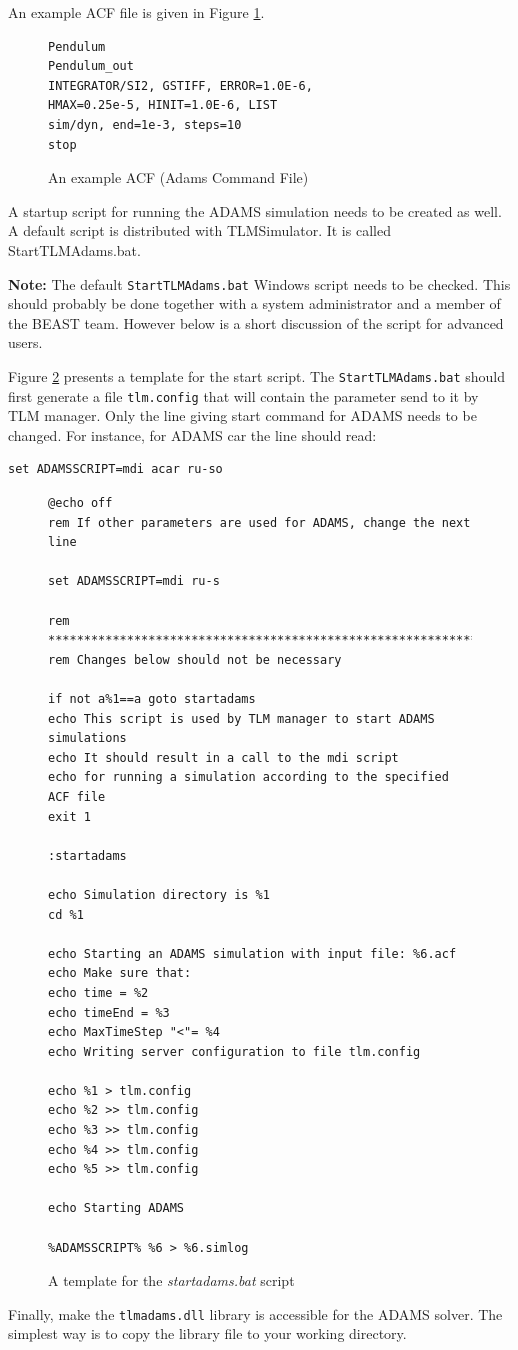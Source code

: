 An example ACF file is given in Figure \ref{figACFEx}.
\begin{figure}[h]
\small{
\begin{verbatim}
Pendulum
Pendulum_out
INTEGRATOR/SI2, GSTIFF, ERROR=1.0E-6,
HMAX=0.25e-5, HINIT=1.0E-6, LIST
sim/dyn, end=1e-3, steps=10
stop
\end{verbatim}
}
\caption{An example ACF (Adams Command File)\label{figACFEx}}
\end{figure}


A startup script for running the ADAMS simulation needs to be created as well. 
A default script is distributed with TLMSimulator. 
It is called StartTLMAdams.bat.

{\bf Note:} The default \verb!StartTLMAdams.bat! Windows script needs to be checked. 
This should probably be done together with a system administrator and a member of the BEAST team. 
However below is a short discussion of the script for advanced users.

Figure \ref{figStartadams} presents a template for the start script.
The \verb!StartTLMAdams.bat! should first generate a file \verb!tlm.config! that will contain the parameter send to it by TLM manager.
Only the line giving start command for ADAMS needs to be changed.
For instance, for ADAMS car the line should read:
\begin{verbatim}
set ADAMSSCRIPT=mdi acar ru-so
\end{verbatim}

\begin{figure}[h]
\small{
\begin{verbatim}
@echo off
rem If other parameters are used for ADAMS, change the next line

set ADAMSSCRIPT=mdi ru-s

rem ***************************************************************
rem Changes below should not be necessary

if not a%1==a goto startadams
echo This script is used by TLM manager to start ADAMS simulations
echo It should result in a call to the mdi script
echo for running a simulation according to the specified ACF file
exit 1

:startadams

echo Simulation directory is %1
cd %1

echo Starting an ADAMS simulation with input file: %6.acf
echo Make sure that:
echo time = %2
echo timeEnd = %3
echo MaxTimeStep "<"= %4
echo Writing server configuration to file tlm.config

echo %1 > tlm.config
echo %2 >> tlm.config
echo %3 >> tlm.config
echo %4 >> tlm.config
echo %5 >> tlm.config

echo Starting ADAMS

%ADAMSSCRIPT% %6 > %6.simlog
\end{verbatim}
}
\caption{A template for the \emph{startadams.bat} script\label{figStartadams}}
\end{figure}

Finally, make the \verb!tlmadams.dll! library is accessible for the ADAMS solver.
The simplest way is to copy the library file to your working directory.


